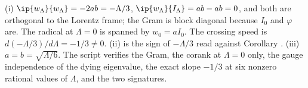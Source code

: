 (i) $\ip{w_{\Lambda}}{w_{\Lambda}} = -2ab = -\Lambda/3$, $\ip{w_{\Lambda}}{I_{\Lambda}} = ab - ab = 0$, and both are orthogonal to the Lorentz frame; the Gram is block diagonal because $I_{0}$ and $\varphi$ are. The radical at $\Lambda = 0$ is spanned by $w_{0} = aI_{0}$. The crossing speed is $d(-\Lambda/3)/d\Lambda = -1/3 \neq 0$. (ii) is the sign of $-\Lambda/3$ read against Corollary . (iii) $a = b = \sqrt{\Lambda/6}$. The script verifies the Gram, the corank at $\Lambda = 0$ only, the gauge independence of the dying eigenvalue, the exact slope $-1/3$ at six nonzero rational values of $\Lambda$, and the two signatures.
